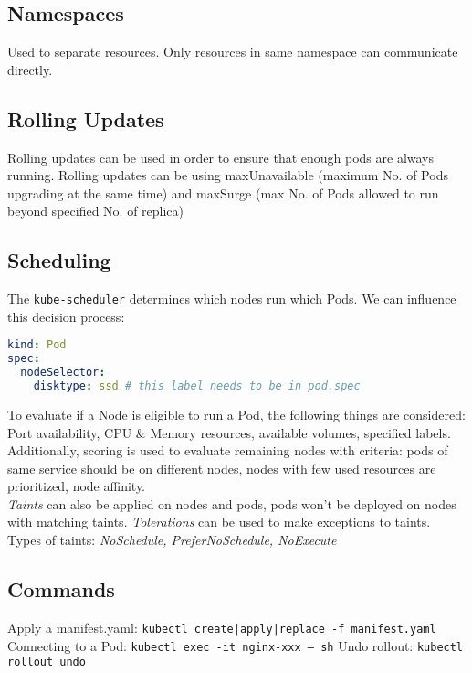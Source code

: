 \subsection{Namespaces}
Used to separate resources. Only resources in same namespace can communicate directly.


\subsection{Rolling Updates}
Rolling updates can be used in order to ensure that enough pods are always running.
Rolling updates can be using maxUnavailable (maximum No. of Pods upgrading at the same time) and maxSurge (max No. of Pods allowed to run beyond specified No. of replica)

\subsection{Scheduling}
The \texttt{kube-scheduler} determines which nodes run which Pods. We can influence this decision process:

\begin{lstlisting}[language=yaml]
kind: Pod
spec:
  nodeSelector:
    disktype: ssd # this label needs to be in pod.spec
\end{lstlisting}

To evaluate if a Node is eligible to run a Pod, the following things are considered: Port availability, CPU \& Memory resources, available volumes, specified labels. Additionally, scoring is used to evaluate remaining nodes with criteria: pods of same service should be on different nodes, nodes with few used resources are prioritized, node affinity. \\
\textit{Taints} can also be applied on nodes and pods, pods won't be deployed on nodes with matching taints. \textit{Tolerations} can be used to make exceptions to taints. Types of taints: \textit{NoSchedule, PreferNoSchedule, NoExecute}


\subsection{Commands}
Apply a manifest.yaml: \texttt{kubectl {create|apply|replace} -f manifest.yaml} \\
Connecting to a Pod: \texttt{kubectl exec -it nginx-xxx -- sh}
Undo rollout: \texttt{kubectl rollout undo}
